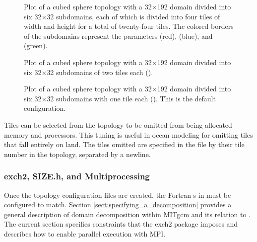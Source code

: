 \begin{figure}
\begin{center}
\end{center} 

\caption{Plot of a cubed sphere topology with a 32$\times$192 domain
divided into six 32$\times$32 subdomains, each of which is divided
into four tiles of width  and height  for a 
total of twenty-four tiles.  The colored borders of the subdomains 
represent the parameters  (red),  (blue), and 
 (green).  } \label{fig:24tile}
\end{figure}

\begin{figure}
\begin{center}
\end{center} 
\caption{Plot of a cubed sphere topology with a 32$\times$192 domain
divided into six 32$\times$32 subdomains of two tiles each
 ().
} \label{fig:12tile}
\end{figure}

\begin{figure}
\begin{center}
\end{center} 
\caption{Plot of a cubed sphere topology with a 32$\times$192 domain
divided into six 32$\times$32 subdomains with one tile each
().  This is the default configuration.
  }
\label{fig:6tile}
\end{figure}


Tiles can be selected from the topology to be omitted from being
allocated memory and processors.  This tuning is useful in ocean
modeling for omitting tiles that fall entirely on land.  The tiles
omitted are specified in the file
by their tile number in the topology, separated by a newline. \\




\subsubsection{exch2, SIZE.h, and Multiprocessing}
\label{sec:exch2mpi}

Once the topology configuration files are created, the Fortran
s in  must be configured to match.
Section \ref{sect:specifying_a_decomposition}  provides a general description of domain
decomposition within MITgcm and its relation to . The
current section specifies constraints that the exch2 package imposes
and describes how to enable parallel execution with MPI.

